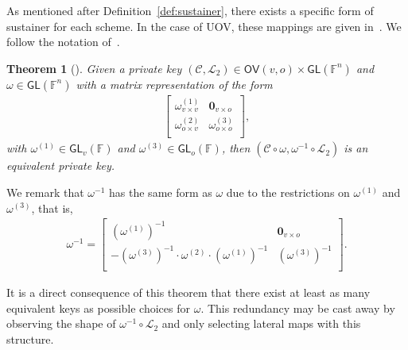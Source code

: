 \documentclass[draft, 12pt, a4paper, oneside]{memoir}
\newtheorem{theorem}{Theorem}[section]
\theoremstyle{definition}
\begin{document}
As mentioned after Definition~\ref{def:sustainer}, there exists a specific form of sustainer for each scheme. In the case of UOV, these mappings are given in~\cite[Section 4.3]{Wolf:201104}. We follow the notation of~\cite{Petzoldt:201307}.

\begin{theorem}[{\cite[Theorem 4.15]{Wolf:201104}}]
  Given a private key $(\mathcal{C}, \mathcal{L}_{2}) \in \mathsf{OV}(v, o) \times \mathsf{GL}(\mathbb{F}^{n})$ and $\omega \in \mathsf{GL}(\mathbb{F}^{n})$ with a matrix representation of the form
  \begin{align}
    \begin{bmatrix}
      \omega_{v \times v}^{(1)} & \mathbf{0}_{v \times o} \\
      \omega_{o \times v}^{(2)} & \omega_{o \times o}^{(3)} \\
    \end{bmatrix},
  \end{align}
  with $\omega^{(1)} \in \mathsf{GL}_{v}(\mathbb{F})$ and $\omega^{(3)} \in \mathsf{GL}_{o}(\mathbb{F})$, then $(\mathcal{C} \circ \omega, \omega^{-1} \circ \mathcal{L}_{2})$ is an equivalent private key.
\end{theorem}

We remark that $\omega^{-1}$ has the same form as $\omega$ due to the restrictions on $\omega^{(1)}$ and $\omega^{(3)}$, that is,
\begin{align}
  \omega^{-1} =
  \begin{bmatrix}
    (\omega^{(1)})^{-1}                                                 & \mathbf{0}_{v \times o}   \\
    -(\omega^{(3)})^{-1} \cdot \omega^{(2)} \cdot (\omega^{(1)})^{-1}   & (\omega^{(3)})^{-1}       \\
  \end{bmatrix}.
\end{align}

It is a direct consequence of this theorem that there exist at least as many equivalent keys as possible choices for $\omega$. This redundancy may be cast away by observing the shape of $\omega^{-1} \circ \mathcal{L}_{2}$ and only selecting lateral maps with this structure.
\end{document}
